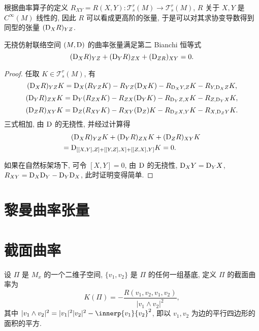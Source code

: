 根据曲率算子的定义 $R_{XY} = R(X,Y)\colon \mathscr{T}_s^r(M)\to\mathscr{T}_s^r(M)$,
$R$ 关于 $X,Y$ 是 $C^{\infty}(M)$ 线性的, 因此 $R$ 可以看成更高阶的张量,
于是可以对其求协变导数得到同型的张量 $(\mathrm{D}_XR)_{YZ}$.

\begin{theorem}
  无挠仿射联络空间 $(M,\mathrm{D})$ 的曲率张量满足第二 Bianchi 恒等式
  \[(\mathrm{D}_XR)_{YZ} + (\mathrm{D}_YR)_{ZX} + (\mathrm{D}_{ZR})_{XY} = 0.\]
\end{theorem}

\begin{proof}
  任取 $K\in\mathscr{T}_s^r(M)$, 有
  \[(\mathrm{D}_XR)_{YZ}K = \mathrm{D}_X(R_{YZ}K) - R_{YZ}(\mathrm{D}_XK) - R_{\mathrm{D}_X Y, Z}K
    - R_{Y, \mathrm{D}_XZ}K,\]
  \[(\mathrm{D}_YR)_{ZX}K = \mathrm{D}_Y(R_{ZX}K) - R_{ZX}(\mathrm{D}_YK) - R_{\mathrm{D}_Y Z, X}K
    - R_{Z, \mathrm{D}_YX}K,\]
  \[(\mathrm{D}_ZR)_{XY}K = \mathrm{D}_Z(R_{XY}K) - R_{XY}(\mathrm{D}_Z)K - R_{\mathrm{D}_Z X, Y}K
    - R_{X, \mathrm{D}_ZY}K.\]
  三式相加, 由 $\mathrm{D}$ 的无挠性, 并经过计算得
  \begin{align*}
      & (\mathrm{D}_XR)_{YZ}K + (\mathrm{D}_YR)_{ZX}K + (\mathrm{D}_ZR)_{XY}K \\
  ={} & \mathrm{D}_{[[X, Y], Z] + [[Y, Z], X] + [[Z, X], Y]}K = 0.
  \end{align*}

  如果在自然标架场下, 可令 $[X,Y]=0$, 由 $\mathrm{D}$ 的无挠性,
  $\mathrm{D}_XY = \mathrm{D}_YX$, $R_{XY} = \mathrm{D}_X\mathrm{D}_Y - \mathrm{D}_Y\mathrm{D}_X$,
  此时证明变得简单.
\end{proof}




\section{黎曼曲率张量}



\section{截面曲率}


设 $\Pi$ 是 $M_x$ 的一个二维子空间, $\{v_1,v_2\}$ 是 $\Pi$ 的任何一组基底,
定义 $\Pi$ 的截面曲率为
\[K(\Pi) = -\frac{R(v_1,v_2,v_1,v_2)}{|v_1\wedge v_2|^2},\]
其中 $|v_1\wedge v_2|^2 = |v_1|^2|v_2|^2-\innerp{v_1}{v_2}^2$,
即以 $v_1,v_2$ 为边的平行四边形的面积的平方.

